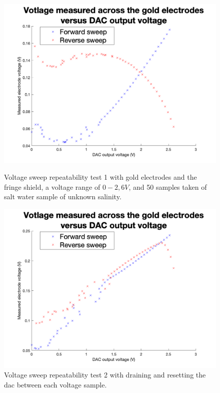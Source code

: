 \begin{figure}[ht]
    \begin{minipage}{0.5\textwidth}
        \centering
        \includegraphics[width=\textwidth]{Figures/Testing/Aus2}
        \caption{Voltage sweep repeatability test 1 with gold electrodes and the fringe shield, a voltage range of $0-2,6V$, and 50 samples taken of salt water sample of unknown salinity.}
        \label{fig:test1} %
    \end{minipage}
    \begin{minipage}{0.5\textwidth}
        \centering
        \includegraphics[width=\textwidth]{Figures/Testing/Aus3}
        \caption{Voltage sweep repeatability test 2 with draining and resetting the \gls{dac} between each voltage sample.}
        \label{fig:test2} %
    \end{minipage}
\end{figure}

